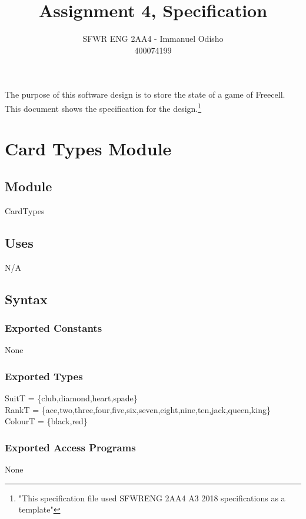 \documentclass[12pt]{article}
\title{Assignment 4, Specification}
\author{SFWR ENG 2AA4 - Immanuel Odisho \\ 400074199}
\begin{document}
\maketitle

The purpose of this software design is to store the state of a game of Freecell.  This
document shows the specification for the design.\footnote{"This specification file used SFWRENG 2AA4 A3 2018 specifications as a template"}




\newpage

\section* {Card Types Module}

\subsection*{Module}

CardTypes

\subsection* {Uses}

N/A

\subsection* {Syntax}

\subsubsection* {Exported Constants}

None

\subsubsection* {Exported Types}

SuitT = \{club,diamond,heart,spade\} \\
RankT = \{ace,two,three,four,five,six,seven,eight,nine,ten,jack,queen,king\} \\
ColourT = \{black,red\}

\subsubsection* {Exported Access Programs}

None
\end{document}
